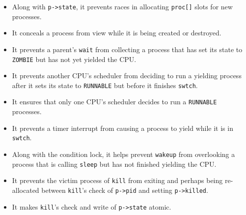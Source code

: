 
\begin{itemize}

\item Along with \lstinline{p->state}, it prevents races in allocating
  \lstinline{proc[]} slots for new processes.

\item It conceals a process from view while it is being created
or destroyed.

\item It prevents a parent's \lstinline{wait} from collecting a
process that has set its state to \lstinline{ZOMBIE} but has
not yet yielded the CPU.

\item It prevents another CPU's scheduler from deciding to run
a yielding process after it sets its state to \lstinline{RUNNABLE} but
before it finishes \lstinline{swtch}.

\item It ensures that only one CPU's scheduler decides to run a
  \lstinline{RUNNABLE} processes.

\item It prevents a timer interrupt from causing a process to
yield while it is in \lstinline{swtch}.

\item Along with the condition lock, it helps prevent \lstinline{wakeup}
from overlooking a process that is calling \lstinline{sleep} but has not
finished yielding the CPU.

\item It prevents the victim process of \lstinline{kill} from exiting
and perhaps being re-allocated between \lstinline{kill}'s check of 
\lstinline{p->pid} and setting \lstinline{p->killed}.

\item It makes \lstinline{kill}'s check and write of \lstinline{p->state}
atomic.

\end{itemize}


